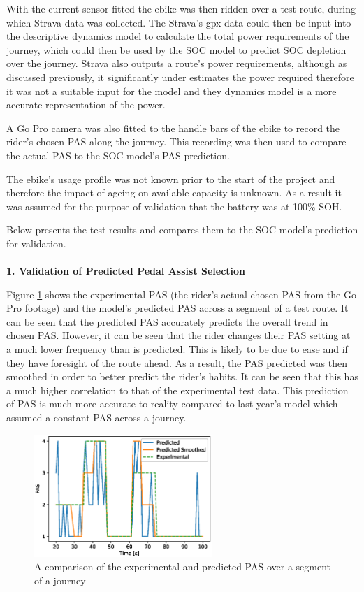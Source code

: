 \documentclass[a4paper, 10pt]{article}
\numberwithin{equation}{section}
\begin{document}
With the current sensor fitted the ebike was then ridden over a test route, during which Strava data was collected. The Strava's gpx data could then be input into the descriptive dynamics model to calculate the total power requirements of the journey, which could then be used by the SOC model to predict SOC depletion over the journey. Strava also outputs a route's power requirements, although as discussed previously, it significantly under estimates the power required therefore it was not a suitable input for the model and they dynamics model is a more accurate representation of the power.

A Go Pro camera was also fitted to the handle bars of the ebike to record the rider's chosen PAS along the journey. This recording was then used to compare the actual PAS to the SOC model's PAS prediction.

The ebike's usage profile was not known prior to the start of the project and therefore the impact of ageing on available capacity is unknown. As a result it was assumed for the purpose of validation that the battery was at 100\% SOH.

Below presents the test results and compares them to the SOC model's prediction for validation.
\\
\\
\textbf{1. Validation of Predicted Pedal Assist Selection}

Figure \ref{fig:val_pas} shows the experimental PAS (the rider's actual chosen PAS from the Go Pro footage) and the model's predicted PAS across a segment of a test route. It can be seen that the predicted PAS accurately predicts the overall trend in chosen PAS. However, it can be seen that the rider changes their PAS setting at a much lower frequency than is predicted. This is likely to be due to ease and if they have foresight of the route ahead. As a result, the PAS predicted was then smoothed in order to better predict the rider's habits. It can be seen that this has a much higher correlation to that of the experimental test data. This prediction of PAS is much more accurate to reality compared to last year's model which assumed a constant PAS across a journey.

\begin{figure}[H]
    \centering
    \includegraphics[width=0.6\textwidth]{images/PAS_pred.eps}
    \caption{A comparison of the experimental and predicted PAS over a segment of a journey}
    \label{fig:val_pas}
\end{figure}
\end{document}
